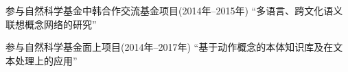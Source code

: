 
\begin{projects}{99}
    \item 参与自然科学基金中韩合作交流基金项目(2014年--2015年)
    ``{多语言、跨文化语义联想概念网络的研究}''
    \item 参与自然科学基金面上项目(2014年--2017年)
    ``{基于动作概念的本体知识库及在文本处理上的应用}''
\end{projects}
